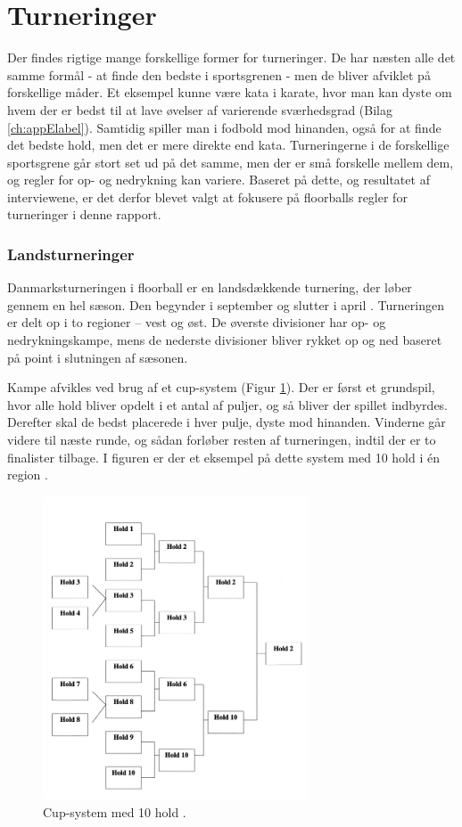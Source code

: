 \section{Turneringer}
Der findes rigtige mange forskellige former for turneringer. De har næsten alle det samme formål - at finde den bedste i sportsgrenen - men de bliver afviklet på forskellige måder. Et eksempel kunne være kata i karate, hvor man kan dyste om hvem der er bedst til at lave øvelser af varierende sværhedsgrad (Bilag \ref{ch:appElabel}). Samtidig spiller man i fodbold mod hinanden, også for at finde det bedste hold, men det er mere direkte end kata. Turneringerne i de forskellige sportsgrene går stort set ud på det samme, men der er små forskelle mellem dem, og regler for op- og nedrykning kan variere. Baseret på dette, og resultatet af interviewene, er det derfor blevet valgt at fokusere på floorballs regler for turneringer i denne rapport.

\subsubsection{Landsturneringer}
Danmarksturneringen i floorball er en landsdækkende turnering, der løber gennem en hel sæson. Den begynder i september og slutter i april \cite{Landsturnering}. Turneringen er delt op i to regioner – vest og øst. De øverste divisioner har op- og nedrykningskampe, mens de nederste divisioner bliver rykket op og ned baseret på point i slutningen af sæsonen.
\par
Kampe afvikles ved brug af et cup-system (Figur \ref{fig:cup-spil}). Der er først et grundspil, hvor alle hold bliver opdelt i et antal af puljer, og så bliver der spillet indbyrdes. Derefter skal de bedst placerede i hver pulje, dyste mod hinanden. Vinderne går videre til næste runde, og sådan forløber resten af turneringen, indtil der er to finalister tilbage. I figuren er der et eksempel på dette system med 10 hold i én region \cite{Unihoc}\cite{Landsturnering}.

\begin{figure}[H]
  \centering
  \includegraphics[width=0.7\textwidth]{figures/cup-spil.png}
  \caption{Cup-system med 10 hold 
  \citep{staevnemappe}. }
  \label{fig:cup-spil}
\end{figure}

